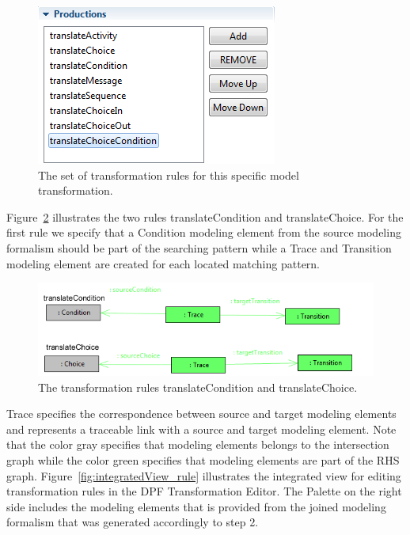 \begin{figure}[H]
	\centering
	\includegraphics[scale=0.7]{./Figures/transformationrules_solution.png}
	\caption[Collection of rules in the DPF Transformation Editor.]
	{The set of transformation rules for this specific model transformation.}
	\label{fig:rule_collection}
\end{figure}

Figure~\ref{fig:translateCond_translateChoic} illustrates the two rules
translateCondition and translateChoice. For the first rule we specify that a
Condition modeling element from the source modeling formalism should be part of
the searching pattern while a Trace and Transition modeling element are created
for each located matching pattern.

\begin{figure}[H]
	\centering
	\includegraphics[scale=0.7]{./Figures/translateChoice_Condition.png}
	\caption[Transformation rules created in the integrated view.]
	{The transformation rules translateCondition and translateChoice.}
	\label{fig:translateCond_translateChoic}
\end{figure}

Trace specifies the correspondence between source and target modeling elements
and represents a traceable link with a source and target modeling element. Note
that the color gray specifies that modeling elements belongs to the
intersection graph while the color green specifies that modeling elements are
part of the RHS graph. Figure~\ref{fig:integratedView_rule} illustrates the
integrated view for editing transformation rules in the DPF Transformation
Editor. The Palette on the right side includes the modeling elements that is
provided from the joined modeling formalism that was generated accordingly to
step 2. 

